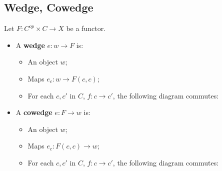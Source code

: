 \documentclass[Total.tex]{subfiles}
\begin{document}
			\subsection{Wedge, Cowedge}
				\begin{Def} 
				 Let $F:C^{op}\times C\rightarrow X$ be a functor. 
					
					\begin{itemize}
							\item A \textbf{wedge} $e:w\rightarrow F$ is:
						\begin{itemize}
							\item An object $w$;
							\item Maps $e_c:w\rightarrow F(c,c)$;
							\item For each $c,c'$ in $C$, $f:c\rightarrow c'$, the following diagram commutes:
							\begin{center}
							\end{center}
						\end{itemize}
						\item A \textbf{cowedge} $e:F\rightarrow w$ is:
						\begin{itemize}
							\item An object $w$;
							\item Maps $e_c:F(c,c)\rightarrow w$;
							\item For each $c,c'$ in $C$, $f:c\rightarrow c'$, the following diagram commutes:
							\begin{center}
							\end{center}
						\end{itemize}
					\end{itemize}
				\end{Def}
\end{document}
